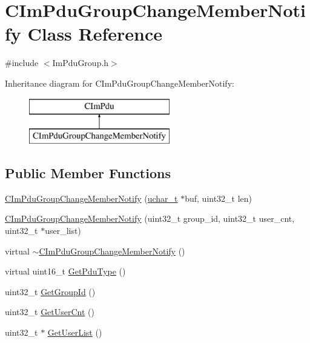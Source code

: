 \hypertarget{class_c_im_pdu_group_change_member_notify}{}\section{C\+Im\+Pdu\+Group\+Change\+Member\+Notify Class Reference}
\label{class_c_im_pdu_group_change_member_notify}


{\ttfamily \#include $<$Im\+Pdu\+Group.\+h$>$}

Inheritance diagram for C\+Im\+Pdu\+Group\+Change\+Member\+Notify\+:\begin{figure}[H]
\begin{center}
\leavevmode
\includegraphics[height=2.000000cm]{class_c_im_pdu_group_change_member_notify}
\end{center}
\end{figure}
\subsection*{Public Member Functions}
\begin{DoxyCompactItemize}
\item 
\hyperlink{class_c_im_pdu_group_change_member_notify_a672df55c4735f2f78284ac82c6f94e7c}{C\+Im\+Pdu\+Group\+Change\+Member\+Notify} (\hyperlink{base_2ostype_8h_a124ea0f8f4a23a0a286b5582137f0b8d}{uchar\+\_\+t} $\ast$buf, uint32\+\_\+t len)
\item 
\hyperlink{class_c_im_pdu_group_change_member_notify_ac3a3277d7b6f7aa439fdfa14914e3e10}{C\+Im\+Pdu\+Group\+Change\+Member\+Notify} (uint32\+\_\+t group\+\_\+id, uint32\+\_\+t user\+\_\+cnt, uint32\+\_\+t $\ast$user\+\_\+list)
\item 
virtual \hyperlink{class_c_im_pdu_group_change_member_notify_a024e80e2ec93a8ffffcc904b59fb418c}{$\sim$\+C\+Im\+Pdu\+Group\+Change\+Member\+Notify} ()
\item 
virtual uint16\+\_\+t \hyperlink{class_c_im_pdu_group_change_member_notify_afcffd94ce8f439d55401555734d8e89c}{Get\+Pdu\+Type} ()
\item 
uint32\+\_\+t \hyperlink{class_c_im_pdu_group_change_member_notify_a9be522138fcb4dccc689077aaa2ccd09}{Get\+Group\+Id} ()
\item 
uint32\+\_\+t \hyperlink{class_c_im_pdu_group_change_member_notify_a79c53e1368a09641f477546b1371889e}{Get\+User\+Cnt} ()
\item 
uint32\+\_\+t $\ast$ \hyperlink{class_c_im_pdu_group_change_member_notify_a89181dec0d4bb1168ed135c733dd52ed}{Get\+User\+List} ()
\end{DoxyCompactItemize}
